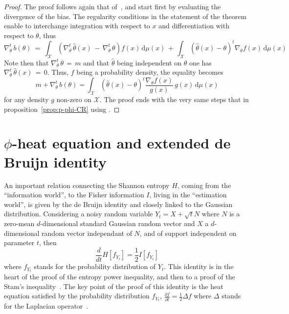 \documentclass[english,sort&compress]{elsarticle}
\theoremstyle{definition}
\theoremstyle{plain}
\theoremstyle{plain}
\def\dmu{\mathrm{d}\mu}
\def\X{\mathcal{X}}
\begin{document}
\begin{proof}
  The proof  follows again that  of~\cite{Ber13}, and start first  by evaluating
  the divergence of the bias.  The regularity conditions in the statement of the
  theorem   enable  to  interchange   integration  with   respect  to   $x$  and
  differentiation with respect to $\theta$, thus
  \[
  \nabla_\theta^t  \,  b(\theta)  \:  =  \: \int_\X  \left(  \nabla_\theta^t  \,
    \widehat{\theta}(x)  \,  - \,  \nabla_\theta^t  \,  \theta  \right) f(x)  \,
  \dmu(x)  \,  +  \,  \int_\X  \left(  \widehat{\theta}(x)  -  \theta  \right)^t
  \nabla_\theta f(x) \, \dmu(x)
  \]
  Note   then  that   $\nabla_\theta^t  \,   \theta  \,   =  \,   m$   and  that
  $\widehat{\theta}$  being independent  on  $\theta$ one  has $\nabla_\theta^t  \,
  \widehat{\theta}(x) \,  = \, 0$. Thus,  $f$ being a  probability density, the
  equality becomes
  \[
  m + \nabla_\theta^t \, b(\theta) = \int_\X \left( \widehat{\theta}(x) - \theta
  \right)^t \frac{\nabla_\theta f(x)}{g(x)} \, g(x) \, \dmu(x)
  \]
  for any density $g$ non-zero on $\X$.  The proof ends with the very same steps
  that in proposition~\ref{prop:p-phi-CR} using \cite[Lemma2]{Ber13}.
\end{proof}


\section{$\phi$-heat equation and extended de Bruijn identity}
\label{sec:deBruijn}

An  important relation  connecting  the  Shannon entropy  $H$,  coming from  the
``information world'', to the Fisher information $I$, living in the ``estimation
world'', is given  by the de Bruijn identity and closely  linked to the Gaussian
distribution. Considering a  noisy random variable $Y_t = X  + \sqrt{t} N$ where
$N$ is  a zero-mean  $d$-dimensional standard Gaussian  random vector and  $X$ a
$d$-dimensional random vector independant of  $N$, and of support independent on
parameter  $t$,  then $$\frac{d}{dt}  H[f_{Y_t}]  =  \frac12 I[f_{Y_t}]$$  where
$f_{Y_t}$ stands for the probability  distribution of $Y_t$. This identity is in
the heart of the  proof of the entropy power inequality, and  then to a proof of
the  Stam's inequality~\cite{CovTho06}.   The key  point  of the  proof of  this
identity  is  the  heat  equation  satisfied  by  the  probability  distribution
$f_{Y_t}$,  $\frac{\partial f}{\partial t}  = \frac12  \Delta f$  where $\Delta$
stands for the Laplacian operator~\cite{Wid75}.
\end{document}
